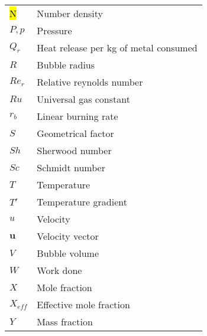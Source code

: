 \begin{table}
    \centering
    \begin{tabular}{w{c}{2cm} m{7cm}}
        \toprule
        \hl{N}               & Number density \\
        $P,p$               & Pressure\\
        $Q_r$               & Heat release per kg of metal consumed\\
        $R$                 & Bubble radius \\
        $Re_r$              & Relative reynolds number \\
        $Ru$                & Universal gas constant\\
        $r_b$               & Linear burning rate \\
        $S$                 & Geometrical factor \\
        $Sh$                & Sherwood number \\
        $Sc$                & Schmidt number \\
        $T$                 & Temperature\\
        $T'$                & Temperature gradient\\
        $u$                 & Velocity  \\
        $\textbf{u}$        & Velocity vector\\
        $V$                 & Bubble volume\\
        $W$                 & Work done \\
        $X$                 & Mole fraction \\
        $X_{eff}$           & Effective mole fraction \\
        $Y$                 & Mass fraction \\
        
        \bottomrule
    \end{tabular}
    \label{tab:Nomenclature}
\end{table}


